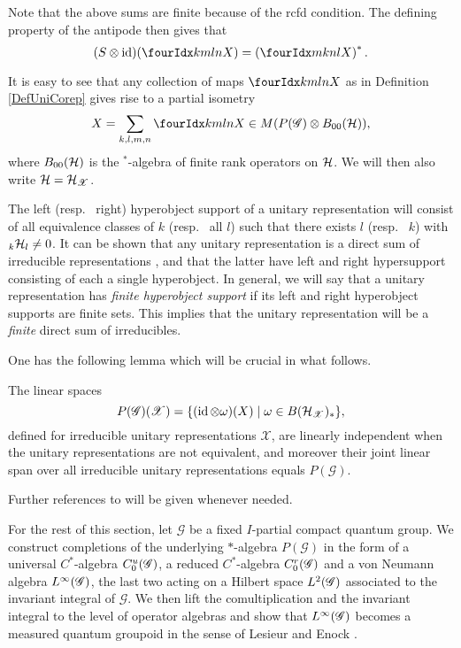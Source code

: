 Note that the above sums are finite because of the rcfd condition. The defining property of the antipode then gives that \[(S\otimes \id)(\Gr{X}{k}{l}{m}{n}) = \left(\Gr{X}{m}{n}{k}{l}\right)^*.\]

It is easy to see that any collection of maps $\Gr{X}{k}{l}{m}{n}$ as in Definition \ref{DefUniCorep} gives rise to a partial isometry \[X = \sum_{k,l,m,n}\Gr{X}{k}{l}{m}{n}\in M(P(\mathscr{G})\otimes B_{00}(\Hsp)),\] where $B_{00}(\mathcal{H})$ is the $^*$-algebra of finite rank operators on $\mathcal{H}$. We will then also write $\mathcal{H} = \mathcal{H}_{\mathscr{X}}$.

The left (resp.~ right) hyperobject support of a unitary representation will consist of all equivalence classes of $k$ (resp.~ all $l$) such that there exists $l$ (resp.~ $k$) with ${}_{k}\mathcal{H}_{l}\neq 0$. It can be shown that any unitary representation is a direct sum of irreducible representations \cite[Corollary 2.5]{DCT1}, and that the latter have left and right hypersupport consisting of each a single hyperobject. In general, we will say that a unitary representation has \emph{finite hyperobject support} if its left and right hyperobject supports are finite sets. This implies that the unitary representation will be a \emph{finite} direct sum of irreducibles. 

One has the following lemma which will be crucial in what follows. 

\begin{Lem}\label{LemSpan} The linear spaces \[P(\mathscr{G})(\mathscr{X}) = \{(\operatorname{id}\otimes \omega)(X)\mid \omega \in B(\mathcal{H}_{\mathscr{X}})_*\},\] defined for irreducible unitary representations $\mathscr{X}$, are linearly independent when the unitary representations are not equivalent, and moreover their joint linear span over all irreducible unitary representations equals $P(\mathscr{G})$.
\end{Lem}

Further references to \cite{DCT1} will be given whenever needed. 

For the rest of this section, let $\mathscr{G}$ be a fixed $I$-partial compact quantum group. We construct
completions of the underlying $*$-algebra $P(\mathscr{G})$ in the form
of a universal $C^{*}$-algebra $C^{u}_{0}(\mathscr{G})$, a reduced $C^{*}$-algebra
$C^{r}_{0}(\mathscr{G})$ and a von Neumann algebra $L^{\infty}(\mathscr{G})$, the last two acting on a
Hilbert space $L^{2}(\mathscr{G})$ associated to the invariant integral of
$\mathscr{G}$.  We then lift the comultiplication and the invariant
integral to the level of
operator algebras and show that $L^{\infty}(\mathscr{G})$ becomes a measured quantum
groupoid in the sense of Lesieur \cite{Les1} and Enock \cite{Eno2}.

